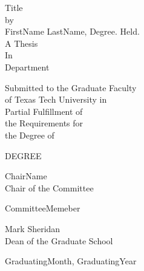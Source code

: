 \begin{titlepage}
   \begin{center}
        Title \\
        \vspace{0.75cm}
        by\\
        \vspace{0.5cm}
        FirstName LastName, Degree. Held.\\
        \vspace{0.5cm}
        A Thesis\\
        \vspace{0.5cm}
        In\\
        \vspace{0.5cm}
        Department\\
        \vspace{0.5cm}
        \begin{singlespace}
        Submitted to the Graduate Faculty\\
        of Texas Tech University in\\
        Partial Fulfillment of\\
        the Requirements for\\
        the Degree of\\
        \end{singlespace}
        \vspace{0.5cm}
        DEGREE\\
        \vspace{1cm}
        \begin{singlespace}
        ChairName\\
        Chair of the Committee\\
        \end{singlespace}
        \vspace{1cm}
        CommitteeMemeber\\
        \vspace{1cm}
        \begin{singlespace}
        Mark Sheridan\\
        Dean of the Graduate School\\
        \end{singlespace}
        \vspace{2cm}
        GraduatingMonth, GraduatingYear
   \end{center}
\newpage
\end{titlepage}